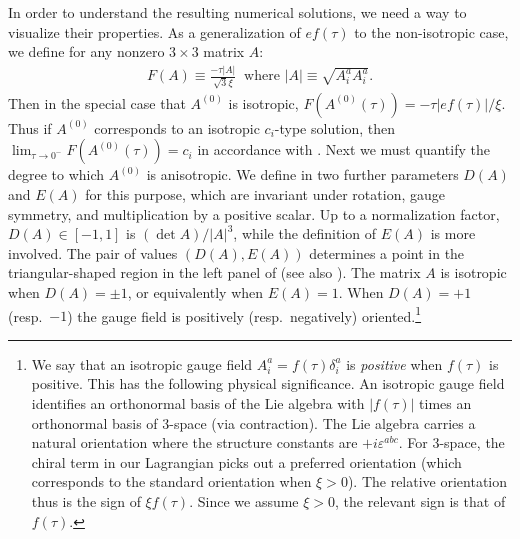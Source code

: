 In order to understand the resulting numerical solutions, we need a way to visualize their properties. As a generalization of $ef(\tau)$ to the non-isotropic case, we define for any nonzero $3\times3$ matrix $A$: 
\begin{align}
F(A)\equiv\frac{-\tau|A|}{\sqrt{3}\xi}\ \textrm{ where }|A|\equiv\sqrt{A_{i}^{a}A_{i}^{a}}.\label{eq:F-norm-fn}
\end{align}
Then in the special case that $A^{(0)}$ is isotropic, $F(A^{(0)}(\tau))=-\tau\left|ef(\tau)\right|/\xi$. Thus if $A^{(0)}$ corresponds to an isotropic $c_{i}$\nobreakdash-type solution, then $\lim_{\tau\to0^{-}}F(A^{(0)}(\tau))=c_{i}$ in accordance with . Next we must quantify the degree to which $A^{(0)}$ is anisotropic. We define in  two further parameters $D(A)$ and $E(A)$ for this purpose, which are invariant under rotation, gauge symmetry, and multiplication by a positive scalar. Up to a normalization factor, $D(A)\in\left[-1,1\right]$ is $(\det A)/\left|A\right|^{3}$, while the definition of $E(A)$ is more involved. The pair of values $(D(A),E(A))$ determines a point in the triangular-shaped region in the left panel of  (see also ). The matrix $A$ is isotropic when $D(A)=\pm1$, or equivalently when $E(A)=1$. When $D(A)=+1$ (resp.\ $-1$) the gauge field is positively (resp.\ negatively) oriented.\footnote{We say that an isotropic gauge field $A_{i}^{a}=f(\tau)\delta_{i}^{a}$ is \emph{positive} when $f(\tau)$ is positive. This has the following physical significance. An isotropic gauge field identifies an orthonormal basis of the Lie algebra with $|f(\tau)|$ times an orthonormal basis of 3-space (via contraction). The Lie algebra carries a natural orientation where the structure constants are $+i\varepsilon^{abc}$. For 3-space, the chiral term in our Lagrangian picks out a preferred orientation (which corresponds to the standard orientation when $\xi>0$). The relative orientation thus is the sign of $\xi f(\tau)$. Since we assume $\xi>0$, the relevant sign is that of $f(\tau)$.}

